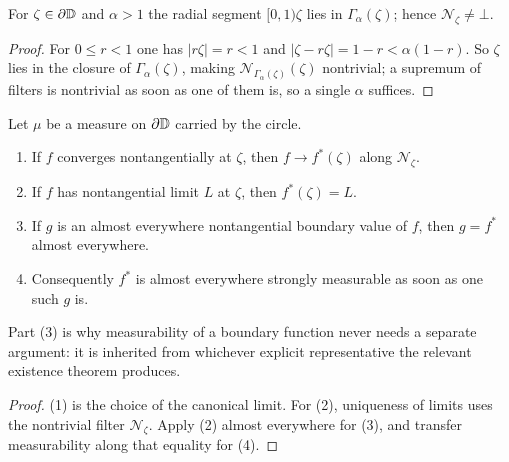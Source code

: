 \begin{lemma}
  \label{lem:nt_filter_neBot}
  \leanok
  For $\zeta\in\partial\mathbb{D}$ and $\alpha>1$ the radial segment $[0,1)\zeta$ lies in
  $\Gamma_\alpha(\zeta)$; hence $\mathcal{N}_\zeta\neq\bot$.
  \begin{proof}
    \leanok
    For $0\le r<1$ one has $|r\zeta|=r<1$ and
    $|\zeta-r\zeta|=1-r<\alpha(1-r)$. So $\zeta$ lies in the closure of
    $\Gamma_\alpha(\zeta)$, making $\mathcal{N}_{\Gamma_\alpha(\zeta)}(\zeta)$
    nontrivial; a supremum of filters is nontrivial as soon as one of them is,
    so a single $\alpha$ suffices.
  \end{proof}
\end{lemma}

\begin{lemma}
  \label{lem:boundary_value_bridge}
  \leanok
  Let $\mu$ be a measure on $\partial\mathbb{D}$ carried by the circle.
  \begin{enumerate}
    \item If $f$ converges nontangentially at $\zeta$, then $f\to f^*(\zeta)$
      along $\mathcal{N}_\zeta$.
    \item If $f$ has nontangential limit $L$ at $\zeta$, then $f^*(\zeta)=L$.
    \item If $g$ is an almost everywhere nontangential boundary value of $f$,
      then $g=f^*$ almost everywhere.
    \item Consequently $f^*$ is almost everywhere strongly measurable as soon as
      one such $g$ is.
  \end{enumerate}
  Part (3) is why measurability of a boundary function never needs a separate
  argument: it is inherited from whichever explicit representative the relevant
  existence theorem produces.
  \begin{proof}
    \leanok
    (1) is the choice of the canonical limit. For (2), uniqueness of limits
    uses the nontrivial filter $\mathcal{N}_\zeta$. Apply (2) almost
    everywhere for (3), and transfer measurability along that equality for (4).
  \end{proof}
\end{lemma}

